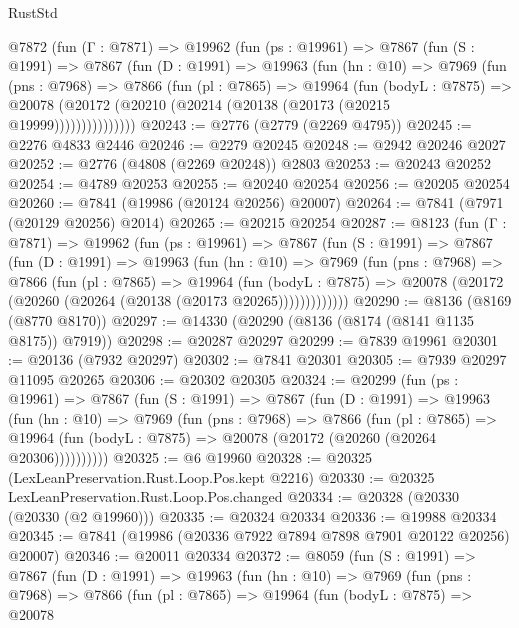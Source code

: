 \begin{lexlean}{RustStd}
\begin{coremodule}
{\begin{coremodule}
{{{{{{{{{{{{{{{{{{{{{{{{{{{{{{{{{{{{{{{{{{{{{{{{{{{{{{    @7872
      (fun (Γ : @7871) =>
      @19962
        (fun (ps : @19961) =>
        @7867
          (fun (S : @1991) =>
          @7867
            (fun (D : @1991) =>
            @19963
              (fun (hn : @10) =>
              @7969
                (fun (pns : @7968) =>
                @7866
                  (fun (pl : @7865) =>
                  @19964
                    (fun (bodyL : @7875) =>
                    @20078 (@20172 (@20210 (@20214 (@20138 (@20173 (@20215 @19999)))))))))))))))
@20243 := @2776 (@2779 (@2269 @4795))
@20245 := @2276 @4833 @2446
@20246 := @2279 @20245
@20248 := @2942 @20246 @2027
@20252 := @2776 (@4808 (@2269 @20248)) @2803
@20253 := @20243 @20252
@20254 := @4789 @20253
@20255 := @20240 @20254
@20256 := @20205 @20254
@20260 := @7841 (@19986 (@20124 @20256) @20007)
@20264 := @7841 (@7971 (@20129 @20256) @2014)
@20265 := @20215 @20254
@20287 := @8123
    (fun (Γ : @7871) =>
    @19962
      (fun (ps : @19961) =>
      @7867
        (fun (S : @1991) =>
        @7867
          (fun (D : @1991) =>
          @19963
            (fun (hn : @10) =>
            @7969
              (fun (pns : @7968) =>
              @7866
                (fun (pl : @7865) =>
                @19964
                  (fun (bodyL : @7875) =>
                  @20078 (@20172 (@20260 (@20264 (@20138 (@20173 @20265)))))))))))))
@20290 := @8136 (@8169 (@8770 @8170))
@20297 := @14330 (@20290 (@8136 (@8174 (@8141 @1135 @8175)) @7919))
@20298 := @20287 @20297
@20299 := @7839 @19961
@20301 := @20136 (@7932 @20297)
@20302 := @7841 @20301
@20305 := @7939 @20297 @11095 @20265
@20306 := @20302 @20305
@20324 := @20299
    (fun (ps : @19961) =>
    @7867
      (fun (S : @1991) =>
      @7867
        (fun (D : @1991) =>
        @19963
          (fun (hn : @10) =>
          @7969
            (fun (pns : @7968) =>
            @7866
              (fun (pl : @7865) =>
              @19964 (fun (bodyL : @7875) => @20078 (@20172 (@20260 (@20264 @20306))))))))))
@20325 := @6 @19960
@20328 := @20325 (LexLeanPreservation.Rust.Loop.Pos.kept @2216)
@20330 := @20325 LexLeanPreservation.Rust.Loop.Pos.changed
@20334 := @20328 (@20330 (@20330 (@2 @19960)))
@20335 := @20324 @20334
@20336 := @19988 @20334
@20345 := @7841 (@19986 (@20336 @7922 @7894 @7898 @7901 @20122 @20256) @20007)
@20346 := @20011 @20334
@20372 := @8059
    (fun (S : @1991) =>
    @7867
      (fun (D : @1991) =>
      @19963
        (fun (hn : @10) =>
        @7969
          (fun (pns : @7968) =>
          @7866
            (fun (pl : @7865) =>
            @19964
              (fun (bodyL : @7875) =>
              @20078
}}}}}}}}}}}}}}}}}}}}}}}}}}}}}}}}}}}}}}}}}}}}}}}}}}}}}}
\end{coremodule}}
\end{coremodule}
\end{lexlean}
